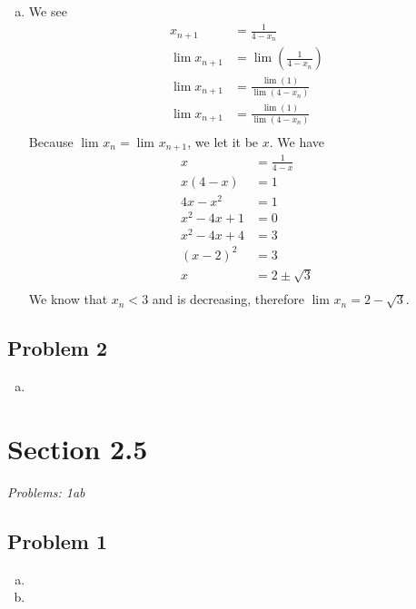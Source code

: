 \documentclass[12pt]{article}
\begin{document}
\begin{enumerate}[a).]
{    }
    \item {
        We see 
        \begin{align*}
            x_{n+1} &= \frac{1}{4 - x_n}\\
            \lim_{}x_{n+1} &= \lim_{} \left( \frac{1}{4 - x_n} \right)\\
            \lim_{}x_{n+1} &=  \frac{\lim_{}(1)}{\lim_{}(4 - x_n)} \\
            \lim_{}x_{n+1} &=  \frac{\lim_{}(1)}{\lim_{}(4 - x_n)} \\
        \end{align*}
            Because $\lim_{}x_n = \lim_{}x_{n+1}$, we let it be $x$. 
            We have 
        \begin{align*}
            x &= \frac{1}{4-x}\\
            x(4-x) &= 1\\
            4x-x^2 &= 1\\
            x^2 -4x +1 &= 0\\
            x^2 -4x +4 &= 3\\
            (x-2)^2 &= 3\\
            x &= 2 \pm \sqrt{3}\\
        \end{align*}
        We know that $x_n < 3$ and is decreasing, therefore $\lim_{}x_n = 2 - \sqrt{3}$. 
    }
\end{enumerate}


\subsection*{Problem 2}
\begin{enumerate}[a).]
    \item {

    }
\end{enumerate}

\vspace*{1cm}

\section*{Section 2.5}
\textit{Problems: 1ab}
\subsection*{Problem 1}
\begin{enumerate}[a).]
    \item {

    }
    \item {

    }
\end{enumerate}
\end{document}
